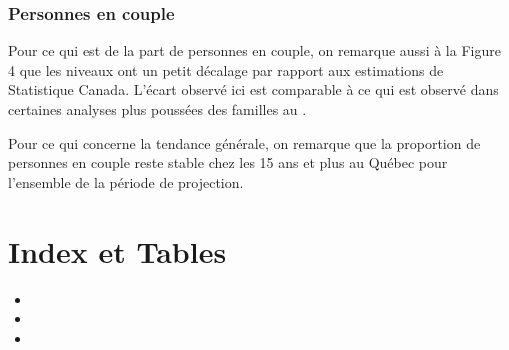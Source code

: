 \documentclass[letterpaper,10pt,french]{sphinxmanual}
\begin{document}
\subsection{Personnes en couple}
\label{\detokenize{resultats:personnes-en-couple}}
\begin{figure}[htbp]
\centering

\noindent{}
\end{figure}

Pour ce qui est de la part de personnes en couple, on remarque aussi à la Figure 4 que les niveaux ont un petit décalage par rapport aux estimations de Statistique Canada. L’écart observé ici est comparable à ce qui est observé dans certaines analyses plus poussées des familles au .

Pour ce qui concerne la tendance générale, on remarque que la proportion de personnes en couple reste stable chez les 15 ans et plus au Québec pour l’ensemble de la période de projection.


\chapter{Index et Tables}
\label{\detokenize{index:index-et-tables}}\begin{itemize}
\item {} 

\item {} 

\item {} 

\end{itemize}


\renewcommand{\indexname}{Index des modules Python}
\begin{sphinxtheindex}
\let\bigletter\sphinxstyleindexlettergroup
\bigletter{s}
\item\relax{}
\end{sphinxtheindex}

\renewcommand{\indexname}{Index}
\printindex
\end{document}
